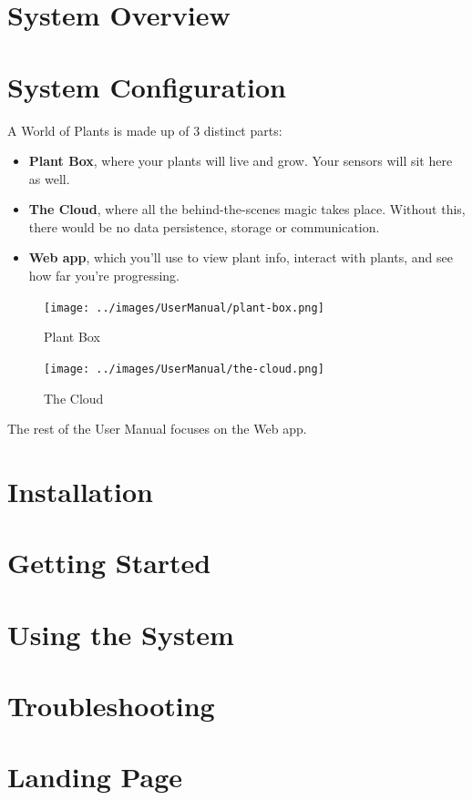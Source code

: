 \documentclass{article}
\begin{document}
\section{System Overview}

\section{System Configuration}
	A World of Plants is made up of 3 distinct parts:
	\begin{itemize}
		\item \textbf{Plant Box}, where your plants will live and grow. Your sensors will sit here as well.
		\item \textbf{The Cloud}, where all the behind-the-scenes magic takes place. Without this, there would be no data persistence, storage or communication.
		\item \textbf{Web app}, which you'll use to view plant info, interact with plants, and see how far you're progressing.
	\end{itemize}
	
	\begin{figure}[H]
		\texttt{[image: ../images/UserManual/plant-box.png]}
		\caption{Plant Box}
	\end{figure}
	
	\begin{figure}[H]
		\texttt{[image: ../images/UserManual/the-cloud.png]}
		\caption{The Cloud}
	\end{figure}
	
	The rest of the User Manual focuses on the Web app.
\section{Installation}

\section{Getting Started}

\section{Using the System}

\section{Troubleshooting}

\section{Landing Page}
\end{document}
